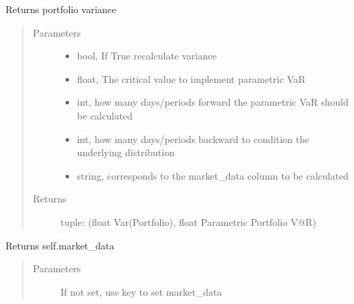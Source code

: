 \documentclass[letterpaper,10pt,english]{sphinxmanual}
\begin{document}
\begin{fulllineitems}
\begin{fulllineitems}
\end{fulllineitems}


\begin{fulllineitems}
\label{\detokenize{securities:risk_dash.securities.Portfolio.get_port_variance}}
Returns portfolio variance
\begin{quote}\begin{description}
\item[{Parameters}] \leavevmode\begin{itemize}
\item {} 
 \textendash{} bool, If True recalculate variance

\item {} 
 \textendash{} float, The critical value to implement parametric VaR

\item {} 
 \textendash{} int, how many days/periods forward the parametric VaR should be calculated

\item {} 
 \textendash{} int, how many days/periods backward to condition the underlying distribution

\item {} 
 \textendash{} string, corresponds to the market\_data column to be calculated

\end{itemize}

\item[{Returns}] \leavevmode
tuple: (float Var(Portfolio), float Parametric Portfolio V@R)

\end{description}\end{quote}

\end{fulllineitems}


\begin{fulllineitems}
\label{\detokenize{securities:risk_dash.securities.Portfolio.get_portfolio_marketdata}}
Returns self.market\_data
\begin{quote}\begin{description}
\item[{Parameters}] \leavevmode
{} \textendash{} If not set, use key to set market\_data


\end{description}
\end{quote}
\end{fulllineitems}
\end{fulllineitems}
\end{document}
